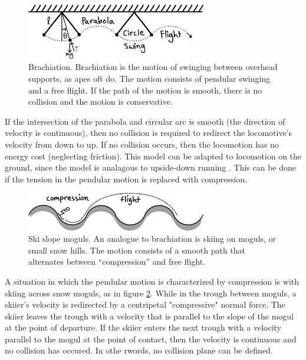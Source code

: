 \begin{figure}[h]		%
\begin{centering}
\includegraphics[width=0.7\textwidth]{Figures/Brachiation}\par
\end{centering}
\caption[Diagram: Brachiation]{Brachiation. Brachiation is the motion of swinging between overhead supports, as apes oft do. The motion consists of pendular swinging and a free flight. If the path of the motion is smooth, there is no collision and the motion is conservative.}
\label{fig:Brachiation}
\end{figure}
%
If the intersection of the parabola and circular arc is smooth (the direction of velocity is continuous), then no collision is required to redirect the locomotive's velocity from down to up. If no collision occurs, then the locomotion has no energy cost (neglecting friction). This model can be adapted to locomotion on the ground, since the model is analagous to upside-down running \cite{ruina05}. This can be done if the tension in the pendular motion is replaced with compression.

\begin{figure}[h]		%
\begin{centering}
\includegraphics[width=0.7\textwidth]{Figures/Moguls}\par
\end{centering}
\caption[Diagram: Ski Slope Moguls]{Ski slope moguls. An analogue to brachiation is skiing on moguls, or small snow hills. The motion consists of a smooth path that alternates between ``compression'' and free flight.}
\label{fig:Moguls}
\end{figure}
%

A situation in which the pendular motion is characterized by compression is with skiing across snow moguls, as in figure \ref{fig:Moguls}. While in the trough between moguls, a skiier's velocity is redirected by a centripetal "compressive" normal force. The skiier leaves the trough with a velocity that is parallel to the slope of the mogul at the point of departure. If the skiier enters the next trough with a velocity parallel to the mogul at the point of contact, then the velocity is continuous and no collision has occured. In othe rwords, no collision plane can be defined.

